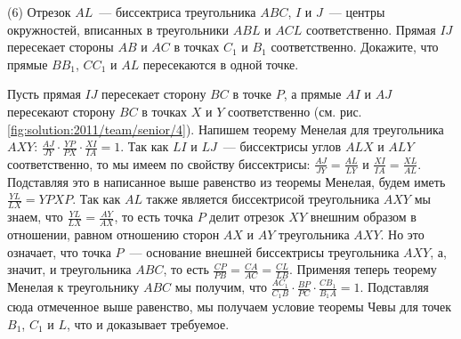 \textsf{(6)}
Отрезок $AL$~--- биссектриса треугольника $ABC$, $I$ и $J$~--- центры
окружностей, вписанных в треугольники $ABL$ и $ACL$ соответственно.
Прямая $IJ$ пересекает стороны $AB$ и $AC$ в точках $C_1$ и $B_1$
соответственно.
Докажите, что прямые $B B_1$, $C C_1$ и $AL$ пересекаются в одной точке.

%
\label{solution:2011/team/senior/4}%
Пусть прямая $IJ$ пересекает сторону $BC$ в точке $P$, а прямые $AI$ и $AJ$
пересекают сторону $BC$ в точках $X$ и $Y$ соответственно
(см. рис. \ref{fig:solution:2011/team/senior/4}).
Напишем теорему Менелая для треугольника $AXY$:
\(
    \frac{AJ}{JY}
    \cdot
    \frac{YP}{PX}
    \cdot
    \frac{XI}{IA}
=
    1
\).
Так как $LI$ и $LJ$~--- биссектрисы углов $ALX$ и $ALY$ соответственно, то мы
имеем по свойству биссектрисы:
$\frac{AJ}{JY} = \frac{AL}{LY}$ и $\frac{XI}{IA} = \frac{XL}{AL}$.
Подставляя это в написанное выше равенство из теоремы Менелая, будем иметь
$\frac{YL}{LX} = {YP}{XP}$.
Так как $AL$ также является биссектрисой треугольника $AXY$ мы знаем, что
$\frac{YL}{LX} = \frac{AY}{AX}$, то есть точка $P$ делит отрезок $XY$ внешним
образом в отношении, равном отношению сторон $AX$ и $AY$ треугольника $AXY$.
Но это означает, что точка $P$~--- основание внешней биссектрисы треугольника
$AXY$, а, значит, и треугольника $ABC$, то есть
$\frac{CP}{PB} = \frac{CA}{AC} = \frac{CL}{LB}$.
Применяя теперь теорему Менелая к треугольнику $ABC$ мы получим, что
\(
    \frac{A C_1}{C_1 B}
    \cdot
    \frac{BP}{PC}
    \cdot
    \frac{C B_1}{B_1 A}
=
    1
\).
Подставляя сюда отмеченное выше равенство, мы получаем условие теоремы Чевы для
точек $B_1$, $C_1$ и $L$, что и доказывает требуемое.


